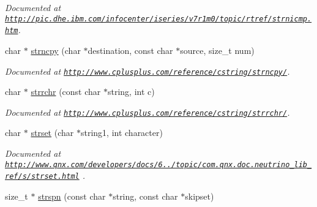 \begin{DoxyCompactItemize}
\begin{DoxyCompactList}\small\item\em Documented at \href{http://pic.dhe.ibm.com/infocenter/iseries/v7r1m0/topic/rtref/strnicmp.htm}{\tt http\-://pic.\-dhe.\-ibm.\-com/infocenter/iseries/v7r1m0/topic/rtref/strnicmp.\-htm}. \end{DoxyCompactList}\item 
\hypertarget{group__string_gac25b4990403370b02ac7f8403a6b3230}{char $\ast$ \hyperlink{group__string_gac25b4990403370b02ac7f8403a6b3230}{strncpy} (char $\ast$destination, const char $\ast$source, size\-\_\-t num)}\label{group__string_gac25b4990403370b02ac7f8403a6b3230}

\begin{DoxyCompactList}\small\item\em Documented at \href{http://www.cplusplus.com/reference/cstring/strncpy/}{\tt http\-://www.\-cplusplus.\-com/reference/cstring/strncpy/}. \end{DoxyCompactList}\item 
\hypertarget{group__string_ga41e787a98ff302e5107f24454762aa3f}{char $\ast$ \hyperlink{group__string_ga41e787a98ff302e5107f24454762aa3f}{strrchr} (const char $\ast$string, int c)}\label{group__string_ga41e787a98ff302e5107f24454762aa3f}

\begin{DoxyCompactList}\small\item\em Documented at \href{http://www.cplusplus.com/reference/cstring/strrchr/}{\tt http\-://www.\-cplusplus.\-com/reference/cstring/strrchr/}. \end{DoxyCompactList}\item 
\hypertarget{group__string_ga61401bc1cda92c2f169f900dd62c5d87}{char $\ast$ \hyperlink{group__string_ga61401bc1cda92c2f169f900dd62c5d87}{strset} (char $\ast$string1, int character)}\label{group__string_ga61401bc1cda92c2f169f900dd62c5d87}

\begin{DoxyCompactList}\small\item\em Documented at \href{http://www.qnx.com/developers/docs/6.5.0/topic/com.qnx.doc.neutrino_lib_ref/s/strset.html}{\tt http\-://www.\-qnx.\-com/developers/docs/6../topic/com.\-qnx.\-doc.\-neutrino\-\_\-lib\-\_\-ref/s/strset.\-html} . \end{DoxyCompactList}\item 
\hypertarget{group__string_ga8cf0610c2c873843994e6e6a55aeee6f}{size\-\_\-t $\ast$ \hyperlink{group__string_ga8cf0610c2c873843994e6e6a55aeee6f}{strspn} (const char $\ast$string, const char $\ast$skipset)}\label{group__string_ga8cf0610c2c873843994e6e6a55aeee6f}


\end{DoxyCompactItemize}
